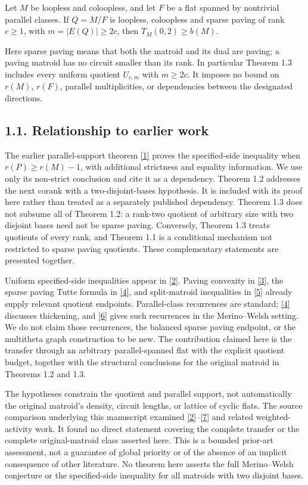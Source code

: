 \documentclass[11pt]{article}
\begin{document}
Let \(M\) be loopless and coloopless, and let \(F\) be a flat spanned by nontrivial parallel classes. If \(Q=M/F\) is loopless, coloopless and sparse paving of rank \(c\ge1\), with \(m=|E(Q)|\ge2c\), then \(T_M(0,2)\ge b(M)\).

Here sparse paving means that both the matroid and its dual are paving; a paving matroid has no circuit smaller than its rank. In particular Theorem 1.3 includes every uniform quotient \(U_{c,m}\) with \(m\ge2c\). It imposes no bound on \(r(M)\), \(r(F)\), parallel multiplicities, or dependencies between the designated directions.

\subsection*{1.1. Relationship to earlier work}

The earlier parallel-support theorem \hyperlink{ref1}{[1]} proves the specified-side inequality when \(r(P)\ge r(M)-1\), with additional strictness and equality information. We use only its non-strict conclusion and cite it as a dependency. Theorem 1.2 addresses the next corank with a two-disjoint-bases hypothesis. It is included with its proof here rather than treated as a separately published dependency. Theorem 1.3 does not subsume all of Theorem 1.2: a rank-two quotient of arbitrary size with two disjoint bases need not be sparse paving. Conversely, Theorem 1.3 treats quotients of every rank, and Theorem 1.1 is a conditional mechanism not restricted to sparse paving quotients. These complementary statements are presented together.

Uniform specified-side inequalities appear in \hyperlink{ref2}{[2]}. Paving convexity in \hyperlink{ref3}{[3]}, the sparse paving Tutte formula in \hyperlink{ref4}{[4]}, and split-matroid inequalities in \hyperlink{ref5}{[5]} already supply relevant quotient endpoints. Parallel-class recurrences are standard; \hyperlink{ref4}{[4]} discusses thickening, and \hyperlink{ref6}{[6]} gives such recurrences in the Merino--Welsh setting. We do not claim those recurrences, the balanced sparse paving endpoint, or the multitheta graph construction to be new. The contribution claimed here is the transfer through an arbitrary parallel-spanned flat with the explicit quotient budget, together with the structural conclusions for the original matroid in Theorems 1.2 and 1.3.

The hypotheses constrain the quotient and parallel support, not automatically the original matroid's density, circuit lengths, or lattice of cyclic flats. The source comparison underlying this manuscript examined \hyperlink{ref2}{[2]}--\hyperlink{ref7}{[7]} and related weighted-activity work. It found no direct statement covering the complete transfer or the complete original-matroid class asserted here. This is a bounded prior-art assessment, not a guarantee of global priority or of the absence of an implicit consequence of other literature. No theorem here asserts the full Merino--Welsh conjecture or the specified-side inequality for all matroids with two disjoint bases.
\end{document}
